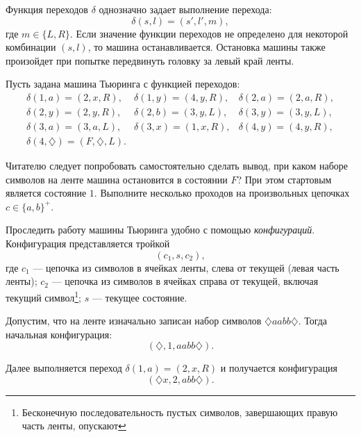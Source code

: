 Функция переходов $\delta$ однозначно задает выполнение перехода: 
\[\delta(s,l)=(s',l',m),\] 
где $m\in\{L,R\}$. Если значение функции переходов не определено для некоторой комбинации $(s,l)$, то машина останавливается. Остановка машины также произойдет при попытке передвинуть головку за левый край ленты.

Пусть задана машина Тьюринга с функцией переходов:
\begin{equation}
    \label{eq:alg:anbnMTpsi}
    \begin{array}{lll}
        \delta(1,a)=(2,x,R),        &\delta(1,y)=(4,y,R),   &\delta(2,a)=(2,a,R),\\
        \delta(2,y)=(2,y,R),        &\delta(2,b)=(3,y,L),   &\delta(3,y)=(3,y,L),\\
        \delta(3,a)=(3,a,L),        &\delta(3,x)=(1,x,R),   &\delta(4,y)=(4,y,R),\\
        \delta(4,\diamondsuit)=(F,\diamondsuit,L).&&
    \end{array}
\end{equation}

Читателю следует попробовать самостоятельно сделать вывод, при каком наборе символов на ленте машина остановится в состоянии $F$? При этом стартовым является состояние $1$. Выполните несколько проходов на произвольных цепочках $c\in\{a,b\}^+$.

Проследить работу машины Тьюринга удобно с помощью \emph{конфигураций}. Конфигурация представляется тройкой 
\[(c_1,s,c_2),\]
где $c_1$ --- цепочка из символов в ячейках ленты, слева от текущей (левая часть ленты); $c_2$ --- цепочка из символов в ячейках справа от текущей, включая текущий символ\footnote{Бесконечную последовательность пустых символов, завершающих правую часть ленты, опускают}; $s$ --- текущее состояние.

Допустим, что на ленте изначально записан набор символов $\diamondsuit aabb\diamondsuit$. Тогда начальная конфигурация:
\[(\diamondsuit,1,aabb\diamondsuit).\]

Далее выполняется переход $\delta(1,a)=(2,x,R)$ и получается конфигурация
\[(\diamondsuit x,2,abb\diamondsuit).\]

